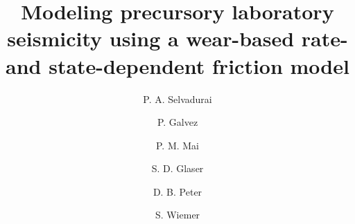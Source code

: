 \documentclass[preprint,1p, 10pt,authoryear]{elsarticle}
\begin{document}
\begin{frontmatter}



\title{Modeling precursory laboratory seismicity using a wear-based rate- and state-dependent friction model}

 \author[1]{P. A. Selvadurai }
\author[2]{P. Galvez}
\author[2]{P. M. Mai}
\author[3]{S. D. Glaser} 
\author[2]{D. B. Peter}
\author[1]{S. Wiemer} 



\address[1]{Swiss Seismological Service, ETH Zurich, Zurich, Switzerland}
\address[2]{King Abdullah University of Science and Technology, Thuwal, Saudi Arabia}
\address[3]{Civil and Environmental Engineering, University of California, Berkeley, California, USA}



\begin{abstract}




\end{abstract}
\end{frontmatter}
\end{document}
